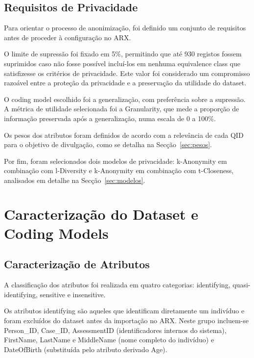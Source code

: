 \subsection{Requisitos de Privacidade}
\label{sec:requisitos}

Para orientar o processo de anonimização, foi definido um conjunto de requisitos antes de proceder à configuração no ARX.

O limite de supressão foi fixado em 5\%, permitindo que até 930 registos fossem suprimidos caso não fosse possível incluí-los em nenhuma equivalence class que satisfizesse os critérios de privacidade. Este valor foi considerado um compromisso razoável entre a proteção da privacidade e a preservação da utilidade do dataset.

O coding model escolhido foi a generalização, com preferência sobre a supressão. A métrica de utilidade selecionada foi a Granularity, que mede a proporção de informação preservada após a generalização, numa escala de 0 a 100\%.

Os pesos dos atributos foram definidos de acordo com a relevância de cada QID para o objetivo de divulgação, como se detalha na Secção~\ref{sec:pesos}.

Por fim, foram selecionados dois modelos de privacidade: k-Anonymity em combinação com l-Diversity e k-Anonymity em combinação com t-Closeness, analisados em detalhe na Secção~\ref{sec:modelos}.


\section{Caracterização do Dataset e Coding Models}
\label{sec:caracterizacao}

\subsection{Caracterização de Atributos}
\label{sec:atributos}

A classificação dos atributos foi realizada em quatro categorias: identifying, quasi-identifying, sensitive e insensitive.

Os atributos identifying são aqueles que identificam diretamente um indivíduo e foram excluídos do dataset antes da importação no ARX. Neste grupo incluem-se Person\_ID, Case\_ID, AssessmentID (identificadores internos do sistema), FirstName, LastName e MiddleName (nome completo do indivíduo) e DateOfBirth (substituída pelo atributo derivado Age).

